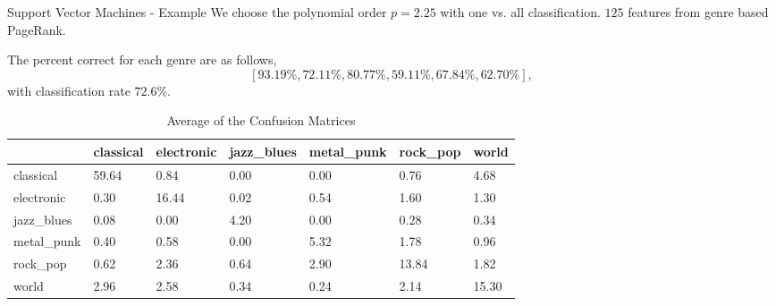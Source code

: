 \documentclass[xcolor=dvipsnames,t]{beamer} %
\begin{document}
%
%
%

\begin{frame}[shrink=20]{Support Vector Machines - Example}
   We choose the polynomial order $p=2.25$ with one vs. all classification.  $125$ features from genre based PageRank.

   The percent correct for each genre are as follows,
      \[ [93.19\%, 72.11\%,80.77\%,59.11\%,67.84\%,62.70\%], \]
   with classification rate $72.6\%$.

   \begin{table}[h!]
      \centering
\begin{tabular}{ l||l | l | l | l | l | l | }
& classical & electronic & jazz\_blues & metal\_punk & rock\_pop & world\\\hline
classical & 59.64 &0.84 &0.00 &0.00 &0.76 &4.68 \\ \hline 
electronic & 0.30 &16.44 &0.02 &0.54 &1.60 &1.30 \\ \hline 
jazz\_blues & 0.08 &0.00 &4.20 &0.00 &0.28 &0.34 \\ \hline 
metal\_punk & 0.40 &0.58 &0.00 &5.32 &1.78 &0.96 \\ \hline 
rock\_pop & 0.62 &2.36 &0.64 &2.90 &13.84 &1.82 \\ \hline 
world & 2.96 &2.58 &0.34 &0.24 &2.14 &15.30 \\ \hline 
\end{tabular}
      \caption{Average of the Confusion Matrices}
   \end{table}

\end{frame}
\end{document}

